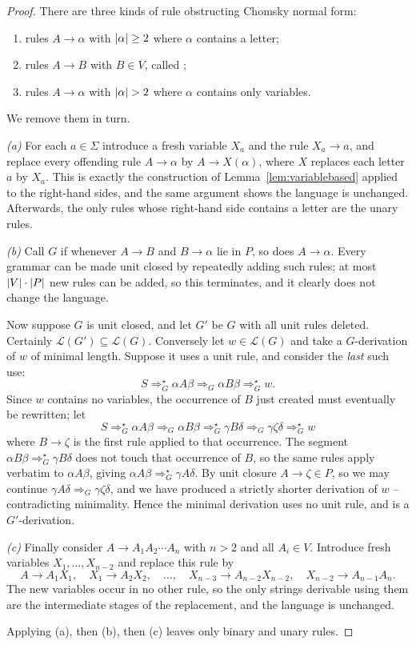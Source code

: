 \documentclass[a4paper]{scrartcl}
\newcommand{\lang}{\mathcal{L}}
\begin{document}
\begin{proof}
	There are three kinds of rule obstructing Chomsky normal form:
	\begin{enumerate}[label=(\alph*)]
		\item rules $A \to \alpha$ with $\lvert\alpha\rvert \geq 2$ where $\alpha$ contains a letter;
		\item rules $A \to B$ with $B \in V$, called ;
		\item rules $A \to \alpha$ with $\lvert\alpha\rvert > 2$ where $\alpha$ contains only variables.
	\end{enumerate}
	We remove them in turn.

	\emph{(a)} For each $a \in \Sigma$ introduce a fresh variable $X_a$ and the rule $X_a \to a$, and replace every offending rule $A \to \alpha$ by $A \to X(\alpha)$, where $X$ replaces each letter $a$ by $X_a$. This is exactly the construction of Lemma~\ref{lem:variablebased} applied to the right-hand sides, and the same argument shows the language is unchanged. Afterwards, the only rules whose right-hand side contains a letter are the unary rules.

	\emph{(b)} Call $G$  if whenever $A \to B$ and $B \to \alpha$ lie in $P$, so does $A \to \alpha$. Every grammar can be made unit closed by repeatedly adding such rules; at most $\lvert V\rvert\cdot\lvert P\rvert$ new rules can be added, so this terminates, and it clearly does not change the language.

	Now suppose $G$ is unit closed, and let $G'$ be $G$ with all unit rules deleted. Certainly $\lang(G') \subseteq \lang(G)$. Conversely let $w \in \lang(G)$ and take a $G$-derivation of $w$ of minimal length. Suppose it uses a unit rule, and consider the \emph{last} such use:
	$$S \Rightarrow_G^\star \alpha A\beta \Rightarrow_G \alpha B \beta \Rightarrow_G^\star w.$$
	Since $w$ contains no variables, the occurrence of $B$ just created must eventually be rewritten; let
	$$S \Rightarrow_G^\star \alpha A\beta \Rightarrow_G \alpha B\beta \Rightarrow_G^\star \gamma B \delta \Rightarrow_G \gamma\zeta\delta \Rightarrow_G^\star w$$
	where $B \to \zeta$ is the first rule applied to that occurrence. The segment $\alpha B \beta \Rightarrow^\star_G \gamma B \delta$ does not touch that occurrence of $B$, so the same rules apply verbatim to $\alpha A \beta$, giving $\alpha A \beta \Rightarrow_G^\star \gamma A \delta$. By unit closure $A \to \zeta \in P$, so we may continue $\gamma A \delta \Rightarrow_G \gamma \zeta \delta$, and we have produced a strictly shorter derivation of $w$ -- contradicting minimality. Hence the minimal derivation uses no unit rule, and is a $G'$-derivation.

	\emph{(c)} Finally consider $A \to A_1A_2\cdots A_n$ with $n > 2$ and all $A_i \in V$. Introduce fresh variables $X_1, \dots, X_{n-2}$ and replace this rule by
	$$A \to A_1X_1, \quad X_1 \to A_2X_2, \quad \dots, \quad X_{n-3}\to A_{n-2}X_{n-2}, \quad X_{n-2} \to A_{n-1}A_n.$$
	The new variables occur in no other rule, so the only strings derivable using them are the intermediate stages of the replacement, and the language is unchanged.

	Applying (a), then (b), then (c) leaves only binary and unary rules.
\end{proof}
\end{document}
